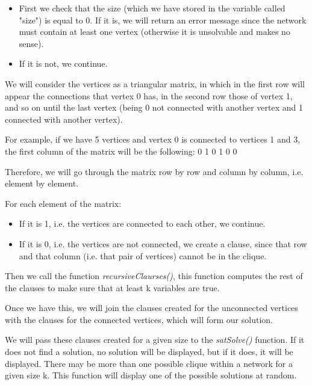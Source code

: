 \documentclass[table]{article}
\begin{document}
\begin{itemize}\leftskip=0.8in
\item First we check that the size (which we have stored in the variable called "size") is equal to 0. If it is, we will return an error message since the network must contain at least one vertex (otherwise it is unsolvable and makes no sense).
\item If it is not, we continue.
\end{itemize}
 
\leftskip=0.5in
We will consider the vertices as a triangular matrix, in which in the first row will appear the connections that vertex 0 has, in the second row those of vertex 1, and so on until the last vertex (being 0 not connected with another vertex and 1 connected with another vertex).\newline

For example, if we have 5 vertices and vertex 0 is connected to vertices 1 and 3, the first column of the matrix will be the following: 0 1 0 1 0 0

Therefore, we will go through the matrix row by row and column by column, i.e. element by element. 

For each element of the matrix:

\begin{itemize}\leftskip=0.8in
\item If it is 1, i.e. the vertices are connected to each other, we continue.
\item If it is 0, i.e. the vertices are not connected, we create a clause, since that row and that column (i.e. that pair of vertices) cannot be in the clique.
\end{itemize}

\leftskip=0.5in
Then we call the function \textit{recursiveClaurses()}, this function computes the rest of the clauses to make sure that at least k variables are true.

Once we have this, we will join the clauses created for the unconnected vertices with the clauses for the connected vertices, which will form our solution.

We will pass these clauses created for a given size to the \textit{satSolve()} function. If it does not find a solution, no solution will be displayed, but if it does, it will be displayed. There may be more than one possible clique within a network for a given size k. This function will display one of the possible solutions at random.\newline
\end{document}
